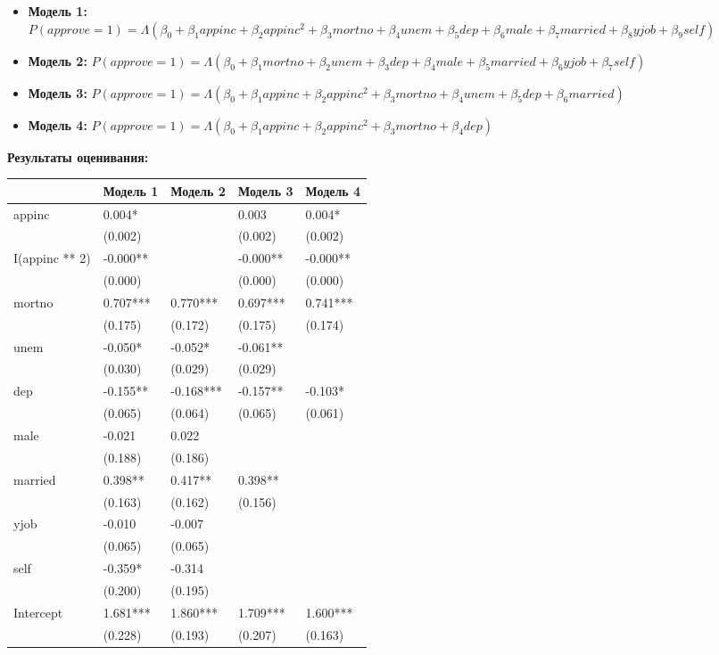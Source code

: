 \documentclass[
  russian,
]{article}
\newcounter{none} %
\providecommand{\tightlist}{%
  \setlength{\itemsep}{0pt}\setlength{\parskip}{0pt}}
\begin{document}
\begin{itemize}
\tightlist
\item
  \textbf{Модель 1:}
  \(P(approve=1) = \Lambda(\beta_0 + \beta_1 appinc + \beta_2 appinc^2 + \beta_3 mortno + \beta_4 unem + \beta_5 dep + \beta_6 male + \beta_7 married + \beta_8 yjob + \beta_9 self)\)
\item
  \textbf{Модель 2:}
  \(P(approve=1) = \Lambda(\beta_0 + \beta_1 mortno + \beta_2 unem + \beta_3 dep + \beta_4 male + \beta_5 married + \beta_6 yjob + \beta_7 self)\)
\item
  \textbf{Модель 3:}
  \(P(approve=1) = \Lambda(\beta_0 + \beta_1 appinc + \beta_2 appinc^2 + \beta_3 mortno + \beta_4 unem + \beta_5 dep + \beta_6 married)\)
\item
  \textbf{Модель 4:}
  \(P(approve=1) = \Lambda(\beta_0 + \beta_1 appinc + \beta_2 appinc^2 + \beta_3 mortno + \beta_4 dep)\)
\end{itemize}

\textbf{Результаты оценивания:}

{\def\LTcaptype{none} %
\begin{longtable}[]{@{}lllll@{}}
\toprule\noalign{}
& Модель 1 & Модель 2 & Модель 3 & Модель 4 \\
\midrule\noalign{}
\endhead
\bottomrule\noalign{}
\endlastfoot
appinc & 0.004* & & 0.003 & 0.004* \\
& (0.002) & & (0.002) & (0.002) \\
I(appinc ** 2) & -0.000** & & -0.000** & -0.000** \\
& (0.000) & & (0.000) & (0.000) \\
mortno & 0.707*** & 0.770*** & 0.697*** & 0.741*** \\
& (0.175) & (0.172) & (0.175) & (0.174) \\
unem & -0.050* & -0.052* & -0.061** & \\
& (0.030) & (0.029) & (0.029) & \\
dep & -0.155** & -0.168*** & -0.157** & -0.103* \\
& (0.065) & (0.064) & (0.065) & (0.061) \\
male & -0.021 & 0.022 & & \\
& (0.188) & (0.186) & & \\
married & 0.398** & 0.417** & 0.398** & \\
& (0.163) & (0.162) & (0.156) & \\
yjob & -0.010 & -0.007 & & \\
& (0.065) & (0.065) & & \\
self & -0.359* & -0.314 & & \\
& (0.200) & (0.195) & & \\
Intercept & 1.681*** & 1.860*** & 1.709*** & 1.600*** \\
& (0.228) & (0.193) & (0.207) & (0.163) \\
\end{longtable}
}
\end{document}
